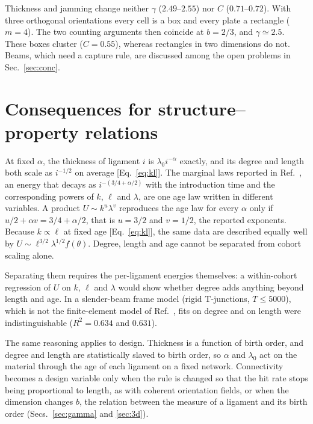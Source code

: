 \documentclass[pre,twocolumn,superscriptaddress,amsmath,amssymb,floatfix]{revtex4-2}
\begin{document}
Thickness and jamming change neither $\gamma$ ($2.49$--$2.55$) nor $C$ ($0.71$--$0.72$).
With three orthogonal orientations every cell is a box and every plate a rectangle
($m=4$). The two counting arguments then coincide at $b=2/3$, and $\gamma\simeq2.5$. These
boxes cluster ($C=0.55$), whereas rectangles in two dimensions do not. Beams, which need
a capture rule, are discussed among the open problems in Sec.~\ref{sec:conc}.

\section{Consequences for structure--property relations}
\label{sec:energy}

At fixed $\alpha$, the thickness of ligament $i$ is $\lambda_0i^{-\alpha}$ exactly,
and its degree and length both scale as $i^{-1/2}$ on average
[Eq.~\eqref{eq:kl}]. The marginal laws reported in
Ref.~\cite{both2026}, an energy that decays as $i^{-(3/4+\alpha/2)}$ with the
introduction time and the corresponding powers of $k$, $\ell$ and $\lambda$, are one
age law written in different variables. A product $U\sim k^u\lambda^v$ reproduces the
age law for every $\alpha$ only if $u/2+\alpha v=3/4+\alpha/2$, that is $u=3/2$ and
$v=1/2$, the reported exponents. Because $k\propto\ell$ at fixed age
[Eq.~\eqref{eq:kl}], the same data are described equally well by
$U\sim\ell^{3/2}\lambda^{1/2}f(\theta)$. Degree, length and age cannot be separated
from cohort scaling alone.

Separating them requires the per-ligament energies themselves: a within-cohort
regression of $U$ on $k$, $\ell$ and $\lambda$ would show whether degree adds anything
beyond length and age. In a slender-beam frame model (rigid T-junctions, $T\le5000$), which is not the
finite-element model of Ref.~\cite{both2026}, fits on degree and on length were
indistinguishable ($R^2=0.634$ and $0.631$).

The same reasoning applies to design. Thickness is a function of birth order, and
degree and length are statistically slaved to birth order, so $\alpha$ and $\lambda_0$
act on the material through the age of each ligament on a fixed network.
Connectivity becomes a design variable only when the rule is changed so that the hit
rate stops being proportional to length, as with coherent orientation fields, or when
the dimension changes $b$, the relation between the measure of a ligament and its birth order
(Secs.~\ref{sec:gamma} and \ref{sec:3d}).
\end{document}
